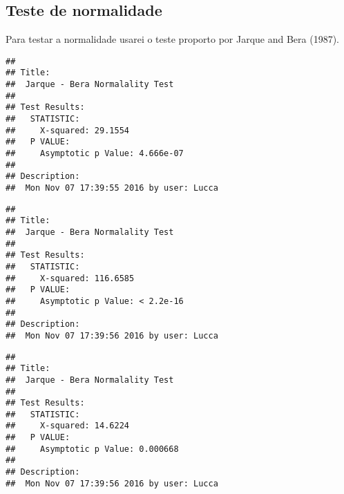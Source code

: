 \documentclass[]{article}
\newenvironment{Shaded}{\begin{snugshade}}{\end{snugshade}}
\newcommand{\KeywordTok}[1]{\textcolor[rgb]{0.13,0.29,0.53}{\textbf{{#1}}}}
\newcommand{\DataTypeTok}[1]{\textcolor[rgb]{0.13,0.29,0.53}{{#1}}}
\newcommand{\StringTok}[1]{\textcolor[rgb]{0.31,0.60,0.02}{{#1}}}
\newcommand{\NormalTok}[1]{{#1}}
\begin{document}
\subsection{Teste de normalidade}\label{teste-de-normalidade}

Para testar a normalidade usarei o teste proporto por Jarque and Bera
(1987).

\begin{Shaded}
\end{Shaded}

\begin{verbatim}
## 
## Title:
##  Jarque - Bera Normalality Test
## 
## Test Results:
##   STATISTIC:
##     X-squared: 29.1554
##   P VALUE:
##     Asymptotic p Value: 4.666e-07 
## 
## Description:
##  Mon Nov 07 17:39:55 2016 by user: Lucca
\end{verbatim}

\begin{Shaded}
\end{Shaded}

\begin{verbatim}
## 
## Title:
##  Jarque - Bera Normalality Test
## 
## Test Results:
##   STATISTIC:
##     X-squared: 116.6585
##   P VALUE:
##     Asymptotic p Value: < 2.2e-16 
## 
## Description:
##  Mon Nov 07 17:39:56 2016 by user: Lucca
\end{verbatim}

\begin{Shaded}
\end{Shaded}

\begin{verbatim}
## 
## Title:
##  Jarque - Bera Normalality Test
## 
## Test Results:
##   STATISTIC:
##     X-squared: 14.6224
##   P VALUE:
##     Asymptotic p Value: 0.000668 
## 
## Description:
##  Mon Nov 07 17:39:56 2016 by user: Lucca
\end{verbatim}
\end{document}
